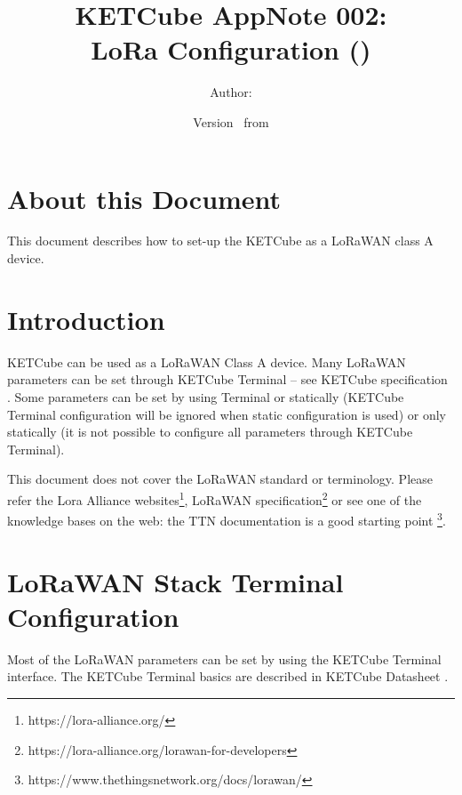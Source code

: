 \documentclass[twoside,a4paper]{refart}
\title{\UWBLogo KETCube AppNote 002:\\ LoRa Configuration (\vhCurrentVersion)}
\author{Author: \vhListAllAuthorsLongWithAbbrev}
\date{Version \vhCurrentVersion\ from \vhCurrentDate}
\begin{document}

\titlepage
\maketitle

\section*{About this Document}


This document describes how to set-up the KETCube as a LoRaWAN class A device.


\setcounter{tocdepth}{1}
\tableofcontents
\clearpage

\listoffigures
\listoftables
\begin{versionhistory}
\end{versionhistory}
\setcounter{table}{0}

\clearpage 
{} 
\pagestyle{headings} 

\clearpage
\clearpage
\section{Introduction}
  KETCube can be used as a LoRaWAN Class A device. Many LoRaWAN parameters can be set through KETCube Terminal -- see KETCube specification \cite{ZCU:KETCube:05-2018}. Some parameters can be set by using Terminal or statically (KETCube Terminal configuration will be ignored when static configuration is used) or only statically (it is not possible to configure all parameters through KETCube Terminal).

  This document does not cover the LoRaWAN standard or terminology. Please refer the Lora Alliance websites\footnote{https://lora-alliance.org/}, LoRaWAN specification\footnote{https://lora-alliance.org/lorawan-for-developers} or see one of the knowledge bases on the web: the TTN documentation is a good starting point \footnote{https://www.thethingsnetwork.org/docs/lorawan/}.
  
\clearpage

\section{LoRaWAN Stack Terminal Configuration}
Most of the LoRaWAN parameters can be set by using the KETCube Terminal interface. The KETCube Terminal basics are described in KETCube Datasheet \cite{ZCU:KETCube:05-2018}.
\end{document}
